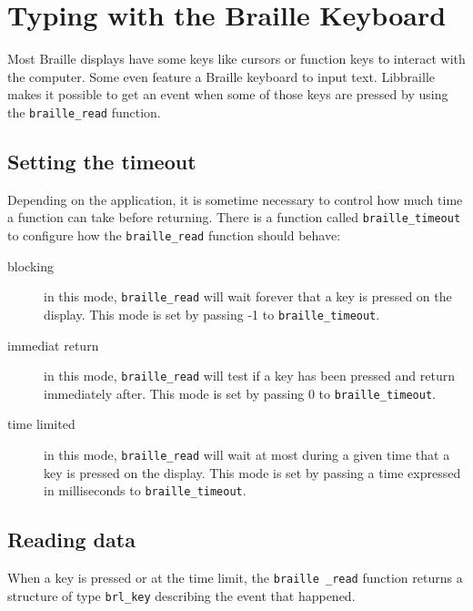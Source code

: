 \documentclass[12pt,a4paper]{article}
\begin{document}
\section{Typing with the Braille Keyboard}

Most Braille displays have some keys like cursors or function keys to
interact with the computer. Some even feature a Braille keyboard to
input text. Libbraille makes it possible to get an event when some of
those keys are pressed by using the {\tt braille\_read} function.

\subsection{Setting the timeout}

Depending on the application, it is sometime necessary to control how
much time a function can take before returning. There is a function
called {\tt braille\_timeout} to configure how the {\tt braille\_read}
function should behave:
\begin{description}
\item[blocking] in this mode, {\tt braille\_read} will wait forever
that a key is pressed on the display. This mode is set by passing -1
to {\tt braille\_timeout}.
\item[immediat return] in this mode, {\tt braille\_read} will test if
a key has been pressed and return immediately after. This mode is set
by passing 0 to {\tt braille\_timeout}.
\item[time limited] in this mode, {\tt braille\_read} will wait at
most during a given time that a key is pressed on the display. This
mode is set by passing a time expressed in milliseconds to
{\tt braille\_timeout}.
\end{description}

\subsection{Reading data}

When a key is pressed or at the time limit, the {\tt braille \_read}
function returns a structure of type {\tt brl\_key} describing the
event that happened.
\end{document}

